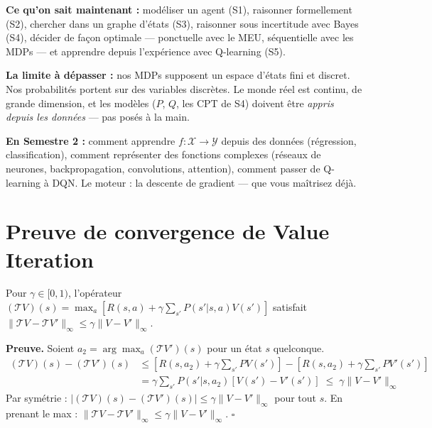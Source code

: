 \documentclass[11pt,a4paper]{article}
\begin{document}
\begin{prereqbox}
\textbf{Ce qu'on sait maintenant :} modéliser un agent (S1), raisonner formellement (S2), chercher dans un graphe d'états (S3), raisonner sous incertitude avec Bayes (S4), décider de façon optimale --- ponctuelle avec le MEU, séquentielle avec les MDPs --- et apprendre depuis l'expérience avec Q-learning (S5).

\textbf{La limite à dépasser :} nos MDPs supposent un espace d'états fini et discret. Nos probabilités portent sur des variables discrètes. Le monde réel est continu, de grande dimension, et les modèles ($P$, $Q$, les CPT de S4) doivent être \textit{appris depuis les données} --- pas posés à la main.

\textbf{En Semestre 2 :} comment apprendre $f : \mathcal{X} \to \mathcal{Y}$ depuis des données (régression, classification), comment représenter des fonctions complexes (réseaux de neurones, backpropagation, convolutions, attention), comment passer de Q-learning à DQN. Le moteur : la descente de gradient --- que vous maîtrisez déjà.
\end{prereqbox}

\appendix

\section{Preuve de convergence de Value Iteration}

\begin{theorembox}
Pour $\gamma \in [0,1)$, l'opérateur $(\mathcal{T}V)(s) = \max_a [R(s,a) + \gamma \sum_{s'} P(s'|s,a) V(s')]$ satisfait $\|\mathcal{T}V - \mathcal{T}V'\|_\infty \leq \gamma \|V - V'\|_\infty$.
\end{theorembox}

\textbf{Preuve.} Soient $a_2 = \arg\max_a (\mathcal{T}V')(s)$ pour un état $s$ quelconque.
\begin{align*}
(\mathcal{T}V)(s) - (\mathcal{T}V')(s) &\leq [R(s,a_2) + \gamma \sum_{s'} P V(s')] - [R(s,a_2) + \gamma \sum_{s'} P V'(s')] \\
&= \gamma \sum_{s'} P(s'|s,a_2)[V(s') - V'(s')] \;\leq\; \gamma \|V-V'\|_\infty
\end{align*}
Par symétrie : $|(\mathcal{T}V)(s) - (\mathcal{T}V')(s)| \leq \gamma \|V-V'\|_\infty$ pour tout $s$. En prenant le max : $\|\mathcal{T}V - \mathcal{T}V'\|_\infty \leq \gamma \|V-V'\|_\infty$. \hfill $\square$
\end{document}
